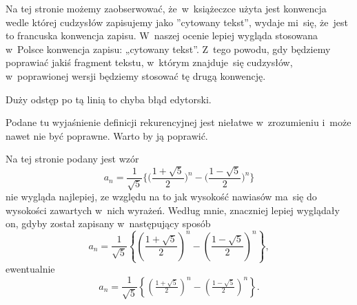 \documentclass[a4paper,11pt]{article}
\numberwithin{equation}{section}
\begin{document}
\vspace{\spaceFour}





\noindent
{} Na tej stronie możemy zaobserwować, że~w~książeczce użyta jest
konwencja wedle której cudzysłów zapisujemy jako ”cytowany tekst”, wydaje
mi~się, że~jest to francuska konwencja zapisu. W~naszej ocenie lepiej
wygląda stosowana w~Polsce konwencja zapisu: „cytowany tekst”. Z~tego
powodu, gdy będziemy poprawiać jakiś fragment tekstu, w~którym znajduje~się
cudzysłów, w~poprawionej wersji będziemy stosować tę drugą konwencję.

\vspace{\spaceFour}





\noindent
{} Duży odstęp po tą linią to chyba błąd edytorski.

\vspace{\spaceFour}





\noindent
{} Podane tu wyjaśnienie definicji rekurencyjnej jest niełatwe
w~zrozumieniu i~może nawet nie być poprawne. Warto by ją poprawić.

\vspace{\spaceFour}





\noindent
{} Na tej stronie podany jest wzór
\begin{equation}
  \label{eq:Gancarzewicz-Arytmetyka-01}
  a_{ n } =
  \frac{ 1 }{ \sqrt{ 5 } }
  \Big\{ \Big( \frac{ 1 + \sqrt{ 5 } }{ 2 } \Big)^{ n }
  - \Big( \frac{ 1 - \sqrt{5} }{ 2 } \Big)^{ n } \Big\}
\end{equation}
nie wygląda najlepiej, ze względu na to jak wysokość nawiasów ma~się
do wysokości zawartych w~nich wyrażeń. Według mnie, znaczniej lepiej
wyglądały on, gdyby został zapisany w~następujący sposób
\begin{equation}
  \label{eq:Gancarzewicz-Arytmetyka-01}
  a_{ n } =
  \frac{ 1 }{ \sqrt{ 5 } }
  \left\{ \left( \frac{ 1 + \sqrt{ 5 } }{ 2 } \right)^{ n }
  - \left( \frac{ 1 - \sqrt{5} }{ 2 } \right)^{ n } \right\},
\end{equation}
ewentualnie
\begin{equation}
  \label{eq:Gancarzewicz-Arytmetyka-02}
  a_{ n } =
  \frac{ 1 }{ \sqrt{ 5 } }
  \left\{ \left( \tfrac{ 1 + \sqrt{ 5 } }{ 2 } \right)^{ n }
  - \left( \tfrac{ 1 - \sqrt{5} }{ 2 } \right)^{ n } \right\}.
\end{equation}
\end{document}
